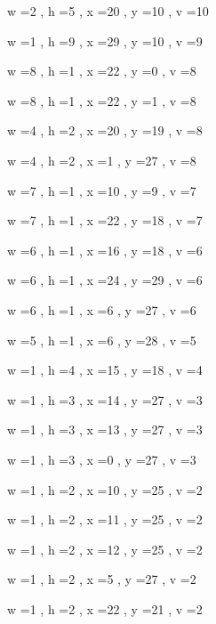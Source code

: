 \documentclass[11pt]{article}
\begin{document}
\par
w =2 , h =5 , x =20 , y =10 , v =10
\par
w =1 , h =9 , x =29 , y =10 , v =9
\par
w =8 , h =1 , x =22 , y =0 , v =8
\par
w =8 , h =1 , x =22 , y =1 , v =8
\par
w =4 , h =2 , x =20 , y =19 , v =8
\par
w =4 , h =2 , x =1 , y =27 , v =8
\par
w =7 , h =1 , x =10 , y =9 , v =7
\par
w =7 , h =1 , x =22 , y =18 , v =7
\par
w =6 , h =1 , x =16 , y =18 , v =6
\par
w =6 , h =1 , x =24 , y =29 , v =6
\par
w =6 , h =1 , x =6 , y =27 , v =6
\par
w =5 , h =1 , x =6 , y =28 , v =5
\par
w =1 , h =4 , x =15 , y =18 , v =4
\par
w =1 , h =3 , x =14 , y =27 , v =3
\par
w =1 , h =3 , x =13 , y =27 , v =3
\par
w =1 , h =3 , x =0 , y =27 , v =3
\par
w =1 , h =2 , x =10 , y =25 , v =2
\par
w =1 , h =2 , x =11 , y =25 , v =2
\par
w =1 , h =2 , x =12 , y =25 , v =2
\par
w =1 , h =2 , x =5 , y =27 , v =2
\par
w =1 , h =2 , x =22 , y =21 , v =2
\par
\newpage
\end{document}
